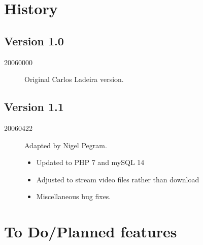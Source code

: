 \documentclass[12pt]{scrartcl} %
\begin{document}
	

\section{History}

	\subsection{Version 1.0}
		\begin{description}
			\item [20060000] 	Original Carlos Ladeira version.
		\end{description}
	
	\subsection{Version 1.1}
		\begin{description}
			\item [20060422] 	Adapted by Nigel Pegram.
			\begin{itemize}
				\item	Updated to PHP 7 and mySQL 14
				\item	Adjusted to stream video files rather than download
				\item	Miscellaneous bug fixes.
			\end{itemize}
		\end{description}



\section{To Do/Planned features}
\end{document}
